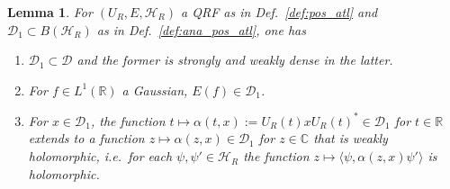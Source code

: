 \documentclass[sn-mathphys-num]{sn-jnl}%
\newcommand{\CC}{\mathbb{C}}
\newcommand{\RR}{\mathbb{R}}
\newcommand{\HH}{\mathcal{H}}
\numberwithin{equation}{section}
\theoremstyle{thmstyleone}%
\newtheorem{lemma}[theorem]{Lemma}
\theoremstyle{thmstyletwo}%
\theoremstyle{thmstylethree}%
\begin{document}
\begin{lemma}
    \label{lem:ana_pos_atl}
    For $(U_R,E,\HH_R)$ a QRF as in Def.\ \ref{def:pos_atl} and $\mathcal{D}_1\subset B(\HH_R)$ as in Def.~\ref{def:ana_pos_atl}, one has
    \begin{enumerate}
        \item $\mathcal{D}_1\subset \mathcal{D}$ and the former is strongly and weakly dense in the latter.
        \item For $f\in L^1(\RR)$ a Gaussian, $E(f)\in\mathcal{D}_1$.
        \item For $x\in\mathcal{D}_1$, the function $t\mapsto \alpha(t,x):=U_R(t)x U_R(t)^*\in\mathcal{D}_1$ for $t\in\RR$ extends to a function $z\mapsto \alpha(z,x)\in\mathcal{D}_1$ for $z\in\CC$ that is weakly holomorphic, i.e.\ for each $\psi,\psi'\in\HH_R$ the function $z\mapsto \langle \psi,\alpha(z,x)\psi'\rangle$ is holomorphic.
    \end{enumerate}
\end{lemma}
\end{document}
